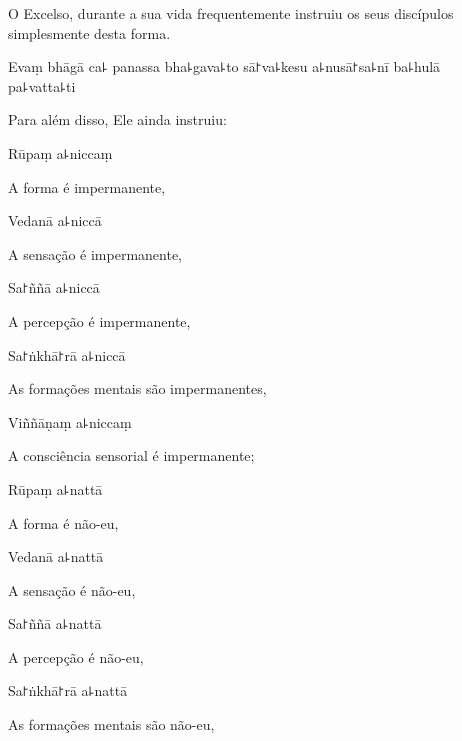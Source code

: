 \begin{english}
  O Excelso, durante a sua vida frequentemente instruiu os seus discípulos \\simplesmente desta forma.
\end{english}

Evaṃ bhāgā ca꜕ panassa bha꜕gava꜕to sā꜓va꜕kesu a꜕nusā꜓sa꜕nī ba꜕hulā pa꜕vatta꜕ti

\begin{english}
  Para além disso, Ele ainda instruiu:
\end{english}


Rūpaṃ a꜕niccaṃ

\begin{english}
  A forma é impermanente,
\end{english}

Vedanā a꜕niccā

\begin{english}
  A sensação é impermanente,
\end{english}

Sa꜓ññā a꜕niccā

\begin{english}
  A percepção é impermanente,
\end{english}

Sa꜓ṅkhā꜓rā a꜕niccā

\begin{english}
  As formações mentais são impermanentes,
\end{english}

Viññāṇaṃ a꜕niccaṃ

\begin{english}
  A consciência sensorial é impermanente;
\end{english}

Rūpaṃ a꜕nattā

\begin{english}
  A forma é não-eu,
\end{english}

Vedanā a꜕nattā

\begin{english}
  A sensação é não-eu,
\end{english}

Sa꜓ññā a꜕nattā

\begin{english}
  A percepção é não-eu,
\end{english}

Sa꜓ṅkhā꜓rā a꜕nattā

\begin{english}
  As formações mentais são não-eu,
\end{english}

